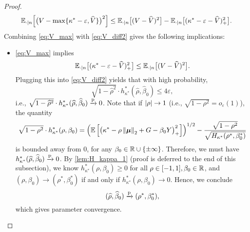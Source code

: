 \begin{proof}
\begin{equation}
    \label{eq:V_max}
    \mathbb{E}_{\cdot | n} \!\left[ \bigl(V - \max\{ \kappa^* - \varepsilon, \widehat V \} \bigr)^2 \right]
    \le \mathbb{E}_{\cdot | n}\bigl[(V - \widehat V)^2\bigr] - 
    \mathbb{E}_{\cdot | n}\bigl[(\kappa^* - \varepsilon - \widehat V)_+^2\bigr].
\end{equation}
Combining \cref{eq:V_max} with \eqref{eq:V_diff2} gives the following implications:
\begin{itemize}
    \item \cref{eq:V_max} implies 
    \begin{equation*}
        \mathbb{E}_{\cdot | n}\bigl[(\kappa^* - \varepsilon - \widehat V)_+^2\bigr]
        \le
        \mathbb{E}_{\cdot | n} \bigl[(V - \widehat V)^2\bigr].
    \end{equation*}
    Plugging this into \cref{eq:V_diff2} yields that with high probability,
    \begin{equation*}
        \sqrt{1 - \hat\rho^2} \cdot h_{\kappa^*}^*(\hat\rho, \hat\beta_0) \le 4 \varepsilon,
    \end{equation*}
    i.e., $\sqrt{1 - \widehat\rho^2} \cdot h_{\kappa^*}^*(\widehat\rho, \widehat\beta_0) \xrightarrow{\mathrm{p}} 0$. Note that if $\left|{\rho}\right| \to 1$ (i.e., $\sqrt{1 - \rho^2} = o_\varepsilon(1)$), the quantity
    \begin{equation*}
            \sqrt{1 - \rho^2} \cdot h_{\kappa^*}^*(\rho, \beta_0)
        = \left( \mathbb{E} \left[ \bigl(  \kappa^* - \rho \left\|{\text{\boldmath $\mu$}}\right\|_2 + G - \beta_0 Y \bigr)_+^2 \right] \right)^{1/2}
        - \frac{\sqrt{1 - \rho^2}}{\sqrt{H_{\kappa^*}(\rho^*, \beta_0^*)}}
    \end{equation*}
    is bounded away from 0, for any $\beta_0 \in \mathbb{R} \cup\{ \pm \infty\}$. Therefore, we must have $h_{\kappa^*}^*(\widehat\rho, \widehat\beta_0) \xrightarrow{\mathrm{p}} 0$. By \cref{lem:H_kappa_1} (proof is deferred to the end of this subsection), we know $h_{\kappa^*}^*(\rho, \beta_0) \ge 0$ for all $\rho \in [-1, 1], \beta_0 \in \mathbb{R}$, and $(\rho, \beta_0) \to (\rho^*, \beta_0^*)$ if and only if $h_{\kappa^*}^*(\rho, \beta_0) \to 0$. Hence, we conclude
    \begin{equation*}
        (\widehat\rho, \widehat\beta_0) \xrightarrow{\mathrm{p}} (\rho^*, \beta_0^*),
    \end{equation*}
    which gives parameter convergence.


\end{itemize}
\end{proof}

